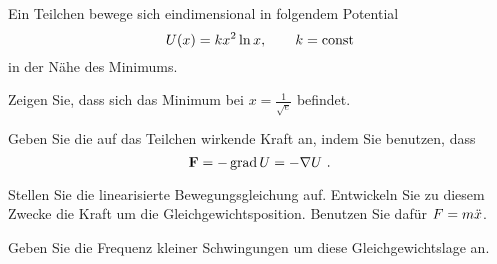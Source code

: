 \begin{atiTask}[
  title = Linearisierte Schwingungen
]
  Ein Teilchen bewege sich eindimensional in folgendem Potential
  \[
    U(x) = kx^2\ln x
    ,\qquad
    k = \text{const}
  \]
  in der Nähe des Minimums.
  \begin{atiSubtasks}
    \item{
      Zeigen Sie, dass sich das Minimum bei $x=\frac{1}{\sqrt{e}}$ befindet.
    }
    \item{
      Geben Sie die auf das Teilchen wirkende Kraft an, indem Sie benutzen, dass
      \[
        \mathbf{F} = -\operatorname{grad} U = -\nabla U \ .
      \]
    }
    \item{
      Stellen Sie die linearisierte Bewegungsgleichung auf.
      Entwickeln Sie zu diesem Zwecke die Kraft um die Gleichgewichtsposition.
      Benutzen Sie dafür $F = m\ddot{x}$.
    }
    \item{
      Geben Sie die Frequenz kleiner Schwingungen um diese Gleichgewichtslage an.
    }
  \end{atiSubtasks}
\end{atiTask}